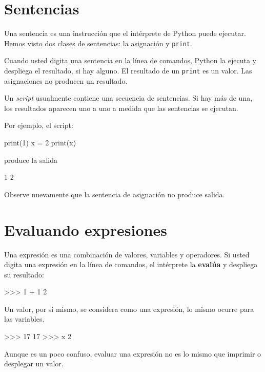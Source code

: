 \section{Sentencias}

Una sentencia es una instrucción que el intérprete de Python puede
ejecutar. Hemos visto dos clases de sentencias: la asignación y \texttt{print}.

Cuando usted digita una sentencia en la línea de comandos, Python la
ejecuta y despliega el resultado, si hay alguno. El resultado de un 
\texttt{print} es un valor. Las asignaciones no producen un resultado.

Un \textit{script} usualmente contiene una secuencia de sentencias. Si hay más 
de una, los resultados aparecen uno a uno a medida que las sentencias
se ejecutan.

Por ejemplo, el script:

\beforeverb
\begin{pythoncode}
print(1)
x = 2
print(x)
\end{pythoncode}
\afterverb
%

produce la salida

\beforeverb
\begin{pyconcode}
1
2
\end{pyconcode}
\afterverb
%

Observe nuevamente que la sentencia de asignación no produce salida.

\section{Evaluando expresiones}

Una expresión es una combinación de valores, variables y operadores.
Si usted digita una expresión en la línea de comandos, el intérprete
la {\bf evalúa} y despliega su resultado:

\beforeverb
\begin{pyconcode}
>>> 1 + 1
2
\end{pyconcode}
\afterverb
%

Un valor, por si mismo, se considera como una expresión, lo mismo ocurre para
las variables.

\beforeverb
\begin{pyconcode}
>>> 17
17
>>> x
2
\end{pyconcode}
\afterverb
%

Aunque es un poco confuso, evaluar una expresión no es lo mismo que imprimir o
desplegar un valor.

